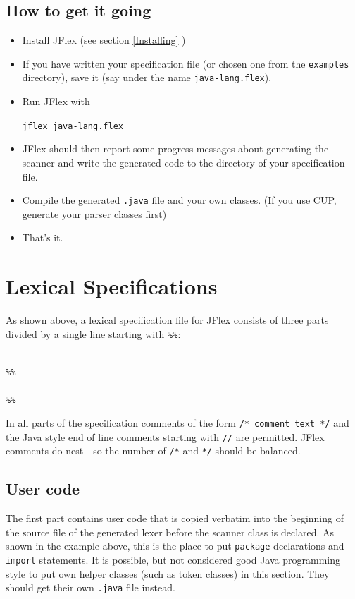 \documentclass[11pt]{scrartcl}
\begin{document}
\subsection{How to get it going}
\begin{itemize}
\item
Install JFlex (see section \ref{Installing} )

\item
If you have written your specification file (or chosen one from the \texttt{examples}
directory), save it (say under the name \texttt{java-lang.flex}).

\item
Run JFlex with

\texttt{jflex java-lang.flex}

\item
JFlex should then report some progress messages about generating the scanner
and write the generated code to the directory of your specification file.

\item
Compile the generated \texttt{.java} file and your own classes. (If you
use CUP, generate your parser classes first)

\item
That's it.
\end{itemize}


\section{Lexical Specifications\label{Specifications}}
As shown above, a lexical specification file for JFlex consists of three
parts divided by a single line starting with \texttt{\%\%}:

\texttt{}\\
\texttt{\%\%}\\
\texttt{}\\
\texttt{\%\%}\\
\texttt{}

In all parts of the specification comments of the form
\texttt{/* comment text */} and the Java style end of line comments starting with \texttt{//}
are permitted. JFlex comments do nest - so the number of \texttt{/*} and \texttt{*/} 
should be balanced.

\subsection{User code\label{SpecUsercode}}
The first part contains user code that is copied verbatim into the beginning
of the source file of the generated lexer before the scanner class is declared. 
As shown in the example above, this is the place to put \texttt{package} 
declarations and \texttt{import}
statements. It is possible, but not considered good Java programming
style to put own helper classes (such as token classes) in this section.
They should get their own \texttt{.java} file instead.
\end{document}
